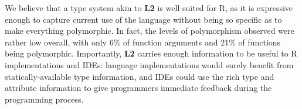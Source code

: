 \documentclass[acmsmall,10pt,review,anonymous]{acmart}\settopmatter{printfolios=true,printccs=false,printacmref=false}
\begin{document}
We believe that a type system akin to {\bf L2} is well suited for R, as it is expressive enough to capture current use of the language without being so specific as to make everything polymorphic.
In fact, the levels of polymorphism observed were rather low overall, with only 6\% of function arguments and 21\% of functions being polymorphic.
Importantly, {\bf L2} carries enough information to be useful to R implementations and IDEs:
language implementations would surely benefit from statically-available type information, and IDEs could use the rich type and attribute information to give programmers immediate feedback during the programming process.

%
%
%


\end{document}
